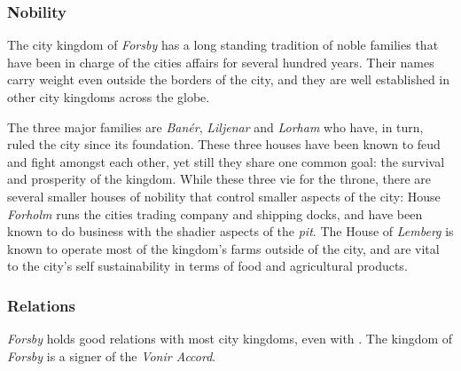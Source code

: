 \subsubsection{Nobility}

The city kingdom of \emph{Forsby} has a long standing tradition of noble
families that have been in charge of the cities affairs for several hundred
years. Their names carry weight even outside the borders of the city, and
they are well established in other city kingdoms across the globe.

The three major families are \emph{Banér}, \emph{Liljenar} and \emph{Lorham}
who have, in turn, ruled the city since its foundation. These three houses
have been known to feud and fight amongst each other, yet still they share one
common goal: the survival and prosperity of the kingdom. While these three vie
for the throne, there are several smaller houses of nobility that control
smaller aspects of the city: House \emph{Forholm} runs the cities trading
company and shipping docks, and have been known to do business with the
shadier aspects of the \emph{pit}. The House of \emph{Lemberg} is known to
operate most of the kingdom's farms outside of the city, and are vital to the
city's self sustainability in terms of food and agricultural products.

\subsubsection*{Relations}

\emph{Forsby} holds good relations with most city kingdoms, even with
. The kingdom of \emph{Forsby} is a signer of the
\emph{Vonir Accord}.

